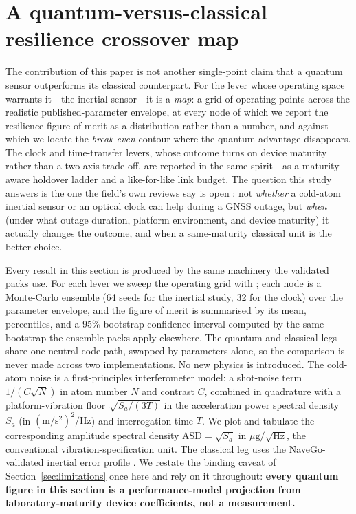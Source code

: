 \section{A quantum-versus-classical resilience crossover map}\label{sec:crossover}

The contribution of this paper is not another single-point claim that a quantum
sensor outperforms its classical counterpart. For the lever whose operating space
warrants it---the inertial sensor---it is a \emph{map}: a grid of operating points
across the realistic published-parameter envelope, at every node of which we report
the resilience figure of merit as a distribution rather than a number, and against
which we locate the \emph{break-even} contour where the quantum advantage disappears.
The clock and time-transfer levers, whose outcome turns on device maturity rather
than a two-axis trade-off, are reported in the same spirit---as a maturity-aware
holdover ladder and a like-for-like link budget. The question this study
answers is the one the field's own reviews say is open
\citep{quantumpntreview2026}: not \emph{whether} a cold-atom inertial sensor or an
optical clock can help during a GNSS outage, but \emph{when} (under what outage
duration, platform environment, and device maturity) it actually changes the
outcome, and when a same-maturity classical unit is the better choice.

Every result in this section is produced by the same machinery the validated packs
use. For each lever we sweep the operating grid with ;
each node is a Monte-Carlo ensemble (64 seeds for the inertial study, 32 for the
clock) over the parameter envelope, and the figure of merit is summarised by its
mean, percentiles, and a 95\% bootstrap confidence interval computed by the same
bootstrap the ensemble packs apply elsewhere. The quantum and classical legs share
one neutral code path, swapped by parameters alone, so the comparison is never made
across two implementations. No new physics is introduced. The cold-atom noise is a
first-principles interferometer model: a shot-noise term $1/(C\sqrt{N})$ in atom
number $N$ and contrast $C$, combined in quadrature with a platform-vibration floor
$\sqrt{S_a/(3T)}$ in the acceleration power spectral density $S_a$ (in
$(\mathrm{m/s^2})^2/\mathrm{Hz}$) and interrogation time $T$. We plot and tabulate the
corresponding amplitude spectral density $\mathrm{ASD}=\sqrt{S_a}$ in
$\mu\mathrm{g}/\sqrt{\mathrm{Hz}}$, the conventional vibration-specification unit. The
classical leg uses the NaveGo-validated inertial error profile
\citep{gonzalez2017navego}. We restate the binding caveat of
Section~\ref{sec:limitations} once here and rely on it throughout: \textbf{every
quantum figure in this section is a performance-model projection from
laboratory-maturity device coefficients, not a measurement.}

